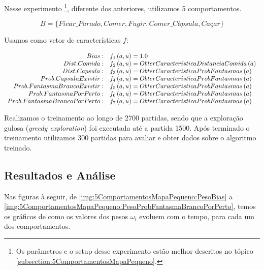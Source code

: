 Nesse experimento%
\footnote{Os parâmetros e o setup desse experimento estão melhor descritos no tópico \ref{subsection:5ComportamentosMapaPequeno}.%
}, diferente dos anteriores, utilizamos 5 comportamentos. 

$$ B = \{Ficar\_Parado, Comer, Fugir, Comer\_Cápsula, \textit{Caçar} \} $$

Usamos como vetor de características $ f $:

\begin{equation}
	\begin{array}{r l}
		Bias: & f_1 \left( a, u \right) = 1.0 \\
		Dist. Comida: & f_2 \left( a, u \right) = ObterCaracteristicaDistanciaComida \left( a \right) \\
		Dist. Capsula: & f_3 \left( a, u \right) = ObterCaracteristicaProbFantasmas \left( a \right) \\
		Prob. Capsula Existir: & f_4 \left( a, u \right) = ObterCaracteristicaProbFantasmas \left( a \right) \\
		Prob. Fantasma Branco Existir: & f_5 \left( a, u \right) = ObterCaracteristicaProbFantasmas \left( a \right) \\
		Prob. Fantasma Por Perto: & f_6 \left( a, u \right) = ObterCaracteristicaProbFantasmas \left( a \right) \\
		Prob. Fantasma Branco Por Perto: & f_7 \left( a, u \right) = ObterCaracteristicaProbFantasmas \left( a \right)
	\end{array}
\end{equation}

Realizamos o treinamento ao longo de 2700 partidas, sendo que a exploração gulosa (\textit{greedy exploration}) foi executada até a partida 1500. Após terminado o treinamento utilizamos 300 partidas para avaliar e obter dados sobre o algoritmo treinado.


\subsection{Resultados e Análise}

Nas figuras à seguir, de \ref{img:5ComportamentosMapaPequeno:PesoBias} a \ref{img:5ComportamentosMapaPequeno:PesoProbFantasmaBrancoPorPerto}, temos os gráficos de como os valores dos pesos $ \omega_i $ evoluem com o tempo, para cada um dos comportamentos.

